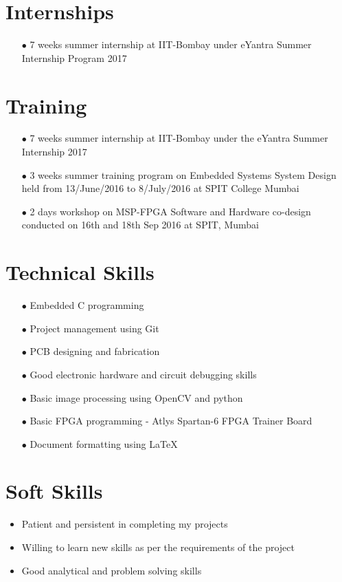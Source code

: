 \documentclass{article}
\begin{document}
	\section*{Internships}
	\begin{itemize}
		\item[$\bullet$] 7 weeks summer internship at IIT-Bombay under eYantra Summer Internship Program 2017
	\end{itemize} 
	
	\section*{Training}
	\begin{itemize}
		\item[$\bullet$] 7 weeks summer internship at IIT-Bombay under the eYantra Summer Internship 2017
		\item[$\bullet$] 3 weeks summer training program on Embedded Systems System Design held from 13/June/2016 to 8/July/2016 at SPIT College Mumbai
		\item[$\bullet$] 2 days workshop on MSP-FPGA Software and Hardware co-design conducted on 16th and 18th Sep 2016 at SPIT, Mumbai
	\end{itemize} 
		
	\section*{Technical Skills}
	\begin{itemize}
		\item[$\bullet$] Embedded C programming
		\item[$\bullet$] Project management using Git
		\item[$\bullet$] PCB designing and fabrication
		\item[$\bullet$] Good electronic hardware and circuit debugging skills
		\item[$\bullet$] Basic image processing using OpenCV and python
		\item[$\bullet$] Basic FPGA programming - Atlys Spartan-6 FPGA Trainer Board
		\item[$\bullet$] Document formatting using \LaTeX
	\end{itemize}
	
	\section*{Soft Skills}
	\begin{itemize}
		\item Patient and persistent in completing my projects
		\item Willing to learn new skills as per the requirements of the project
		\item Good analytical and problem solving skills
	\end{itemize}
	
\end{document}
